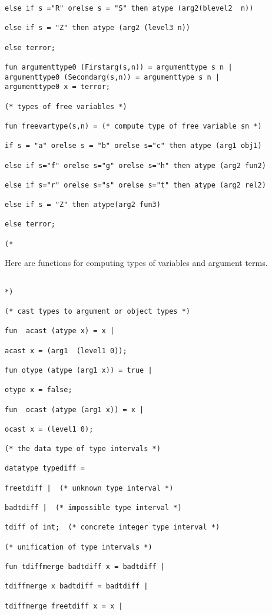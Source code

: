 \documentclass{article}
\begin{document}
{{\begin{verbatim}
else if s ="R" orelse s = "S" then atype (arg2(blevel2  n))

else if s = "Z" then atype (arg2 (level3 n))

else terror;

fun argumenttype0 (Firstarg(s,n)) = argumenttype s n |
argumenttype0 (Secondarg(s,n)) = argumenttype s n |
argumenttype0 x = terror;

(* types of free variables *)

fun freevartype(s,n) = (* compute type of free variable sn *)

if s = "a" orelse s = "b" orelse s="c" then atype (arg1 obj1)

else if s="f" orelse s="g" orelse s="h" then atype (arg2 fun2)

else if s="r" orelse s="s" orelse s="t" then atype (arg2 rel2)

else if s = "Z" then atype(arg2 fun3)

else terror;

(*

\end{verbatim}

Here are functions for computing types of variables and argument terms.

\begin{verbatim}

*)

(* cast types to argument or object types *)

fun  acast (atype x) = x |

acast x = (arg1  (level1 0));

fun otype (atype (arg1 x)) = true |

otype x = false;

fun  ocast (atype (arg1 x)) = x |

ocast x = (level1 0);

(* the data type of type intervals *)

datatype typediff =

freetdiff |  (* unknown type interval *)

badtdiff |  (* impossible type interval *)

tdiff of int;  (* concrete integer type interval *)

(* unification of type intervals *)

fun tdiffmerge badtdiff x = badtdiff |

tdiffmerge x badtdiff = badtdiff |

tdiffmerge freetdiff x = x |


\end{verbatim}}}
\end{document}
